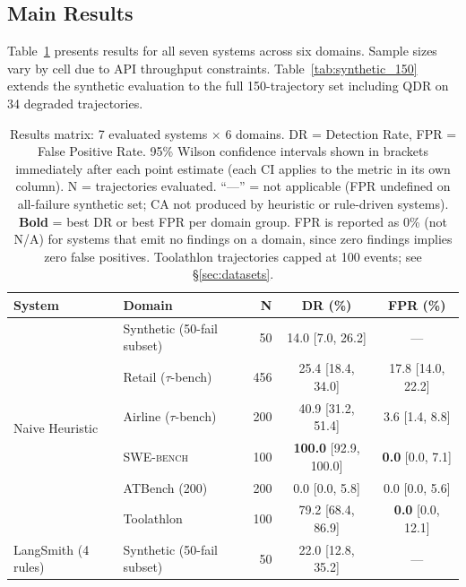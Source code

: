\documentclass[11pt]{article}
\newcommand{\taubench}{$\tau$-bench\xspace}
\newcommand{\swebench}{\textsc{SWE-bench}\xspace}
\begin{document}
\subsection{Main Results}

Table~\ref{tab:main_results} presents results for all seven systems across
six domains. Sample sizes vary by cell due to API throughput constraints.
Table~\ref{tab:synthetic_150} extends the synthetic evaluation to the
full 150-trajectory set including QDR on 34 degraded trajectories.

\begin{table}[t]
\centering
\caption{Results matrix: 7 evaluated systems $\times$ 6 domains.
DR = Detection Rate, FPR = False Positive Rate.
95\% Wilson confidence intervals shown in brackets immediately after each
point estimate (each CI applies to the metric in its own column).
N = trajectories evaluated.
``---'' = not applicable (FPR undefined on all-failure synthetic set; CA not
produced by heuristic or rule-driven systems). \textbf{Bold} = best DR or
best FPR per domain group.
FPR is reported as 0\% (not N/A) for systems that emit no
findings on a domain, since zero findings implies zero false positives.
Toolathlon trajectories capped at 100 events; see \S\ref{sec:datasets}.}
\label{tab:main_results}
\scriptsize
\setlength{\tabcolsep}{4pt}
\begin{tabular}{@{}llrcc@{}}
\toprule
\textbf{System} & \textbf{Domain} & \textbf{N} & \textbf{DR (\%)} & \textbf{FPR (\%)} \\
\midrule
\multirow{6}{*}{Naive Heuristic}
  & Synthetic (50-fail subset)   & 50    & 14.0 {\scriptsize [7.0, 26.2]}             & --- \\
  & Retail (\taubench)     & 456   & 25.4 {\scriptsize [18.4, 34.0]}            & 17.8 {\scriptsize [14.0, 22.2]} \\
  & Airline (\taubench)    & 200   & 40.9 {\scriptsize [31.2, 51.4]}            & 3.6 {\scriptsize [1.4, 8.8]} \\
  & \swebench              & 100   & \textbf{100.0} {\scriptsize [92.9, 100.0]} & \textbf{0.0} {\scriptsize [0.0, 7.1]} \\
  & ATBench (200)          & 200   & 0.0 {\scriptsize [0.0, 5.8]}               & 0.0 {\scriptsize [0.0, 5.6]} \\
  & Toolathlon             & 100   & 79.2 {\scriptsize [68.4, 86.9]}            & \textbf{0.0} {\scriptsize [0.0, 12.1]} \\
\midrule
\multirow{6}{*}{LangSmith (4 rules)}
  & Synthetic (50-fail subset)   & 50    & 22.0 {\scriptsize [12.8, 35.2]}            & --- \\

\end{tabular}
\end{table}
\end{document}

